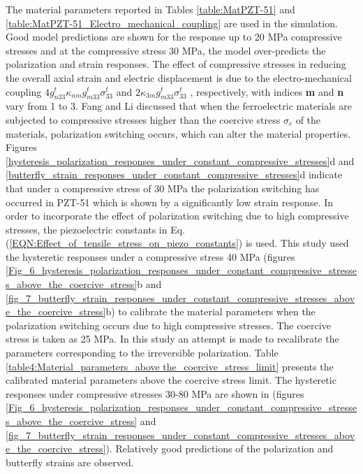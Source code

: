 The material parameters reported in Tables \ref{table:MatPZT-51} and \ref{table:MatPZT-51_Electro_mechanical_coupling} are used in the simulation. 
Good model predictions are shown for the response up to 20 MPa compressive stresses and at the compressive stress 30 MPa,
 the model over-predicts the polarization and strain responses. 
 The effect of compressive stresses in reducing the overall axial strain and
 electric displacement is due to the electro-mechanical coupling $4g_{n33}^t{\kappa _{nm}}g_{m33}^t\sigma _{33}^t$ and $2{\kappa _{3m}}g_{m33}^t\sigma _{33}^t$ , respectively, with indices \textbf{m} and \textbf{n} vary from 1 to 3. Fang and Li \cite{Li2004959} discussed that when the ferroelectric materials are subjected to compressive stresses higher than the coercive stress $\sigma _c$ of the materials, polarization switching occurs, which can alter the material properties.
 Figures \ref{hysteresis_polarization_responses_under_constant_compressive_stresses}d and \ref{butterfly_strain_responses_under_constant_compressive_stresses}d indicate that under a compressive stress of 30 MPa the polarization switching has occurred in PZT-51 which is shown by a significantly low strain response.
In order to incorporate the effect of polarization switching due to high compressive stresses, the piezoelectric constants in Eq. (\ref{EQN:Effect_of_tensile_stress_on_piezo_constants}) is used. 
This study used the hysteretic responses under a compressive stress 40 MPa (figures \ref{Fig_6_hysteresis_polarization_responses_under_constant_compressive_stresses_above_the_coercive_stress}b and \ref{fig_7_butterfly_strain_responses_under_constant_compressive_stresses_above_the_coercive_stress}b) to calibrate the material parameters when the polarization switching occurs due to high compressive stresses.  
The coercive stress is taken as 25 MPa. 
In this study an attempt is made to recalibrate the parameters corresponding to the irreversible polarization. 
Table \ref{table4:Material_parameters_above the_coercive_stress_limit} presents the calibrated material parameters above the coercive stress limit. 
The hysteretic responses under compressive stresses 30-80 MPa are shown in (figures \ref{Fig_6_hysteresis_polarization_responses_under_constant_compressive_stresses_above_the_coercive_stress} and \ref{fig_7_butterfly_strain_responses_under_constant_compressive_stresses_above_the_coercive_stress}). 
Relatively good predictions of the polarization and butterfly strains are observed.


